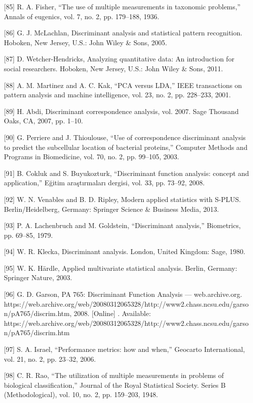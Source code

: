 \documentclass[sn-mathphys-num]{sn-jnl}%
\begin{document}
[85] R. A. Fisher, “The use of multiple measurements in taxonomic problems,” Annals of eugenics, vol. 7, no. 2, pp. 179–188, 1936.

[86] G. J. McLachlan, Discriminant analysis and statistical pattern recognition. Hoboken, New Jersey, U.S.: John Wiley & Sons, 2005.

[87] D. Wetcher-Hendricks, Analyzing quantitative data: An introduction for social researchers. Hoboken, New Jersey, U.S.: John Wiley & Sons, 2011.

[88] A. M. Martinez and A. C. Kak, “PCA versus LDA,” IEEE transactions on pattern analysis and machine intelligence, vol. 23, no. 2, pp. 228–233, 2001.

[89] H. Abdi, Discriminant correspondence analysis, vol. 2007. Sage Thousand Oaks, CA, 2007, pp. 1–10.

[90] G. Perriere and J. Thioulouse, “Use of correspondence discriminant analysis to predict the subcellular location of bacterial proteins,” Computer Methods and Programs in Biomedicine, vol. 70, no. 2, pp. 99–105, 2003.

[91] B. Cokluk and S. Buyukozturk, “Discriminant function analysis: concept and application,” Eğitim araştırmaları dergisi, vol. 33, pp. 73–92, 2008.

[92] W. N. Venables and B. D. Ripley, Modern applied statistics with S-PLUS. Berlin/Heidelberg, Germany: Springer Science & Business Media, 2013.

[93] P. A. Lachenbruch and M. Goldstein, “Discriminant analysis,” Biometrics, pp. 69–85, 1979.

[94] W. R. Klecka, Discriminant analysis. London, United Kingdom: Sage, 1980.

[95] W. K. Härdle, Applied multivariate statistical analysis. Berlin, Germany: Springer Nature, 2003.

[96] G. D. Garson, PA 765: Discriminant Function Analysis — web.archive.org. https://web.archive.org/web/20080312065328/http://www2.chass.ncsu.edu/garson/pA765/discrim.htm, 2008. [Online] . Available: https://web.archive.org/web/20080312065328/http://www2.chass.ncsu.edu/garson/pA765/discrim.htm

[97] S. A. Israel, “Performance metrics: how and when,” Geocarto International, vol. 21, no. 2, pp. 23–32, 2006.

[98] C. R. Rao, “The utilization of multiple measurements in problems of biological classification,” Journal of the Royal Statistical Society. Series B (Methodological), vol. 10, no. 2, pp. 159–203, 1948.
\end{document}
